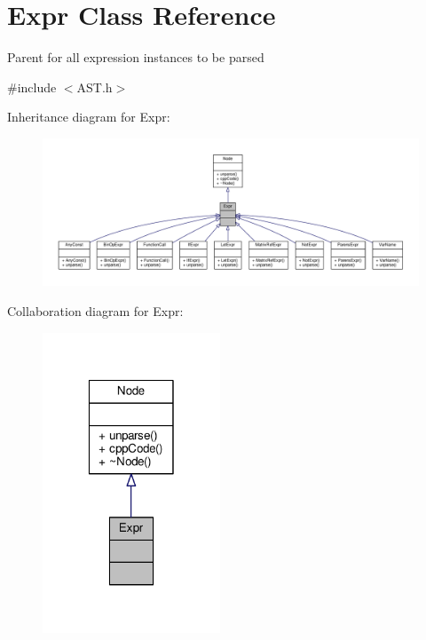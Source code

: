 \hypertarget{classExpr}{\section{Expr Class Reference}
\label{classExpr}
}


Parent for all expression instances to be parsed \par
  




{\ttfamily \#include $<$A\-S\-T.\-h$>$}



Inheritance diagram for Expr\-:\nopagebreak
\begin{figure}[H]
\begin{center}
\leavevmode
\includegraphics[width=350pt]{classExpr__inherit__graph}
\end{center}
\end{figure}


Collaboration diagram for Expr\-:\nopagebreak
\begin{figure}[H]
\begin{center}
\leavevmode
\includegraphics[width=150pt]{classExpr__coll__graph}
\end{center}
\end{figure}
